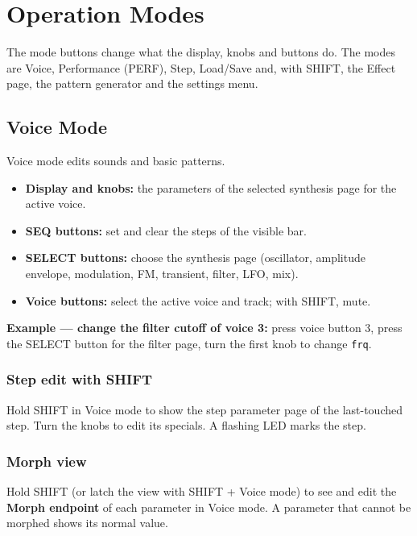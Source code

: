 \section{Operation Modes}\label{operation-modes}

The mode buttons change what the display, knobs and buttons do. The
modes are Voice, Performance (PERF), Step, Load/Save and, with SHIFT,
the Effect page, the pattern generator and the settings menu.

\subsection{Voice Mode}\label{voice-mode}

Voice mode edits sounds and basic patterns.

\begin{itemize}
\tightlist
\item
  \textbf{Display and knobs:} the parameters of the selected synthesis
  page for the active voice.
\item
  \textbf{SEQ buttons:} set and clear the steps of the visible bar.
\item
  \textbf{SELECT buttons:} choose the synthesis page (oscillator,
  amplitude envelope, modulation, FM, transient, filter, LFO, mix).
\item
  \textbf{Voice buttons:} select the active voice and track; with SHIFT,
  mute.
\end{itemize}

\textbf{Example --- change the filter cutoff of voice 3:} press voice
button 3, press the SELECT button for the filter page, turn the first
knob to change \texttt{frq}.

\subsubsection{Step edit with SHIFT}\label{step-edit-with-shift}

Hold SHIFT in Voice mode to show the step parameter page of the
last-touched step. Turn the knobs to edit its specials. A flashing LED
marks the step.

\subsubsection{Morph view}\label{morph-view}

Hold SHIFT (or latch the view with SHIFT + Voice mode) to see and edit
the \textbf{Morph endpoint} of each parameter in Voice mode. A parameter
that cannot be morphed shows its normal value.

